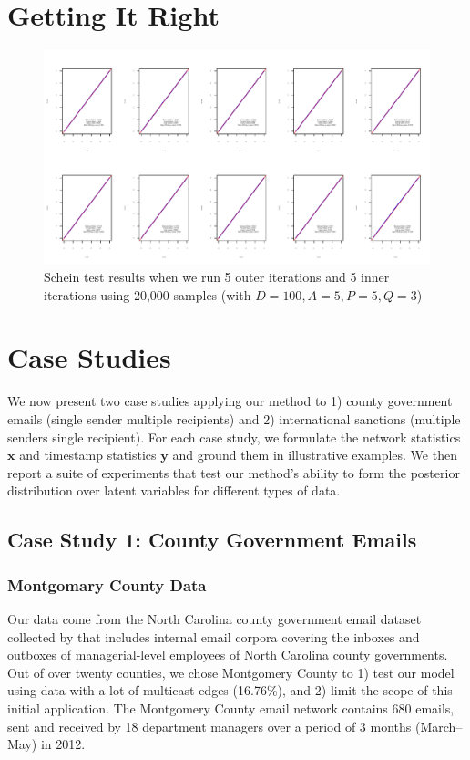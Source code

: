 \documentclass[12pt]{article}
\begin{document}
 \section{Getting It Right}\label{sec:GiR}
 \begin{figure}[H]
 	\centering
 	\includegraphics[width=1\textwidth, trim = 0.5cm 1cm 0.5cm 1cm, clip=true]{Multicast_Schein.pdf}	
 	\caption {Schein test results when we run 5 outer iterations and 5 inner iterations using 20,000 samples (with $D = 100, A = 5, P = 5, Q = 3$)}
 	\label{figure:GiR}
 \end{figure}
 
\section{Case Studies}\label{sec:case studies}
We now present two case studies applying our method to 1) county government emails (single sender multiple recipients) and 2) international sanctions (multiple senders single recipient). For each case study,
we formulate the network statistics $\boldsymbol{x}$ and timestamp statistics $\boldsymbol{y}$ and ground them in
illustrative examples. We then report a suite of experiments that test our method’s ability to form the posterior distribution over latent variables for different types of data. 
 	   \subsection{Case Study 1: County Government Emails}\label{subsec:Emails}
 	  	   \subsubsection{Montgomary County Data}\label{subsubsec:Montgomery}
 	   Our data come from the North Carolina county government email dataset collected by \cite{ben2017transparency} that includes internal email corpora covering the inboxes and outboxes of managerial-level employees of North Carolina county governments. Out of over twenty counties, we chose Montgomery County to 1) test our model using data with a lot of multicast edges (16.76\%), and 2) limit the scope of this initial application. The Montgomery County email network contains 680 emails, sent and received by 18 department managers over a period of 3 months (March--May) in 2012. 
\end{document}
